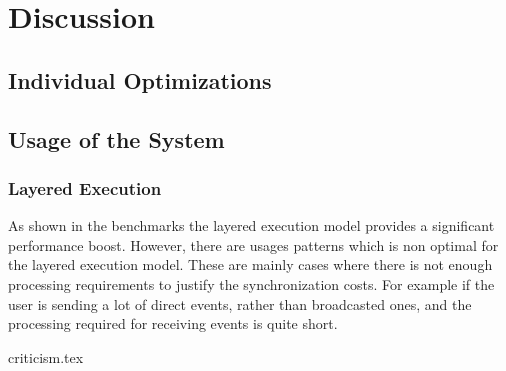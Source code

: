 \chapter{Discussion}
\label{chap:discussion}

\section{Individual Optimizations}
\subsection{}

\section{Usage of the System}
\subsection{Layered Execution}
As shown in the benchmarks the layered execution model provides a significant performance boost.
However, there are usages patterns which is non optimal for the layered execution model.
These are mainly cases where there is not enough processing requirements to justify the synchronization costs.
For example if the user is sending a lot of direct events, rather than broadcasted ones,
and the processing required for receiving events is quite short.



{criticism.tex}
